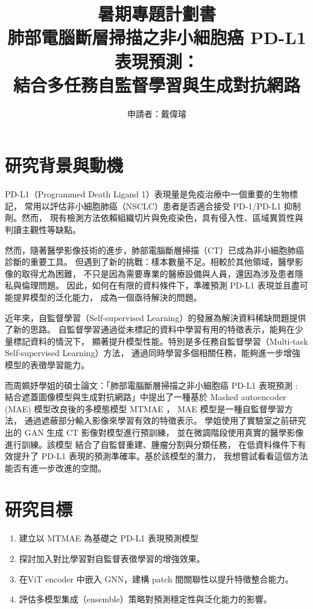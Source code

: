 \documentclass[12pt,a4paper]{article}
\title{暑期專題計劃書\\\large 肺部電腦斷層掃描之非小細胞癌 PD-L1 表現預測：\\結合多任務自監督學習與生成對抗網路}
\author{申請者：戴偉璿}
\begin{document}

\maketitle

\newpage

\section{研究背景與動機}
PD-L1（Programmed Death Ligand 1）表現量是免疫治療中一個重要的生物標記，
常用以評估非小細胞肺癌（NSCLC）患者是否適合接受 PD-1/PD-L1 抑制劑。然而，
現有檢測方法依賴組織切片與免疫染色，具有侵入性、區域異質性與判讀主觀性等缺點。

然而，隨著醫學影像技術的進步，肺部電腦斷層掃描（CT）已成為非小細胞肺癌診斷的重要工具。
但遇到了新的挑戰：樣本數量不足。相較於其他領域，醫學影像的取得尤為困難，
不只是因為需要專業的醫療設備與人員，還因為涉及患者隱私與倫理問題。
因此，如何在有限的資料條件下，準確預測 PD-L1 表現並且盡可能提昇模型的泛化能力，
成為一個亟待解決的問題。

近年來，自監督學習（Self-supervised Learning）的發展為解決資料稀缺問題提供了新的思路。
自監督學習通過從未標記的資料中學習有用的特徵表示，能夠在少量標記資料的情況下，
顯著提升模型性能。特別是多任務自監督學習（Multi-task Self-supervised Learning）方法，
通過同時學習多個相關任務，能夠進一步增強模型的表徵學習能力。

而周姵妤學姐的碩士論文：「肺部電腦斷層掃描之非小細胞癌 PD-L1 表現預測 :
結合遮蓋圖像模型與生成對抗網路」中提出了一種基於 Masked autoencoder (MAE)
模型改良後的多模態模型 MTMAE ， MAE 模型是一種自監督學習方法，
通過遮蔽部分輸入影像來學習有效的特徵表示。
學姐使用了實驗室之前研究出的 GAN 生成 CT 影像對模型進行預訓練，
並在微調階段使用真實的醫學影像進行訓練。該模型
結合了自監督重建、腫瘤分割與分類任務，
在低資料條件下有效提升了 PD-L1 表現的預測準確率。基於該模型的潛力，
我想嘗試看看這個方法能否有進一步改進的空間。

\section{研究目標}
\begin{enumerate}
  \item 建立以 MTMAE 為基礎之 PD-L1 表現預測模型
  \item 探討加入對比學習對自監督表徵學習的增強效果。
  \item 在ViT encoder 中嵌入 GNN，建構 patch 間關聯性以提升特徵整合能力。
  \item 評估多模型集成（ensemble）策略對預測穩定性與泛化能力的影響。
\end{enumerate}
\end{document}
